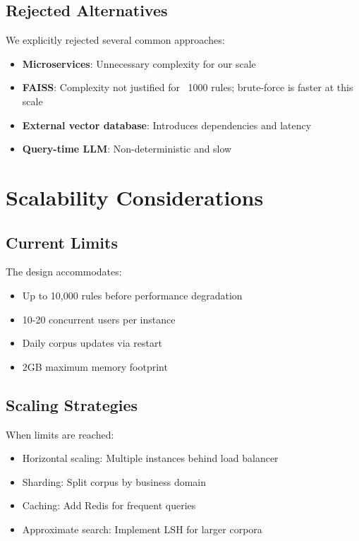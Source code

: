 \subsection{Rejected Alternatives}

We explicitly rejected several common approaches:

\begin{itemize}[leftmargin=*,itemsep=2pt,topsep=2pt]
  \item \textbf{Microservices}: Unnecessary complexity for our scale
  \item \textbf{FAISS}: Complexity not justified for ~1000 rules; brute-force is faster at this scale
  \item \textbf{External vector database}: Introduces dependencies and latency
  \item \textbf{Query-time LLM}: Non-deterministic and slow
\end{itemize}

\section{Scalability Considerations}

\subsection{Current Limits}

The design accommodates:
\begin{itemize}[leftmargin=*,itemsep=2pt,topsep=2pt]
  \item Up to 10,000 rules before performance degradation
  \item 10-20 concurrent users per instance
  \item Daily corpus updates via restart
  \item 2GB maximum memory footprint
\end{itemize}

\subsection{Scaling Strategies}

When limits are reached:
\begin{itemize}[leftmargin=*,itemsep=2pt,topsep=2pt]
  \item Horizontal scaling: Multiple instances behind load balancer
  \item Sharding: Split corpus by business domain
  \item Caching: Add Redis for frequent queries
  \item Approximate search: Implement LSH for larger corpora
\end{itemize}

